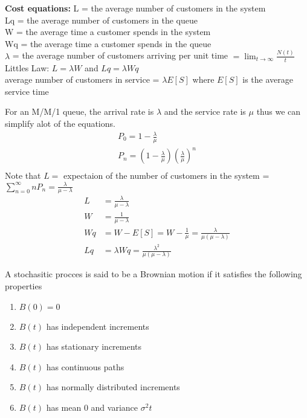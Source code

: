 \documentclass[answers,12pt,addpoints]{exam}
\begin{document}
\begin{definition}
    \textbf{Cost equations:}
    L = the average number of customers in the system\\
    Lq = the average number of customers in the queue\\
    W = the average time a customer spends in the system\\
    Wq = the average time a customer spends in the queue\\
    $\lambda$ = the average number of customers arriving per unit time $= \lim_{t \to \infty} \frac{N(t)}{t}$\\
    Littles Law: $L = \lambda W$ and $Lq = \lambda Wq$\\
    average number of customers in service = $\lambda E[S]$ where $E[S]$ is the average service time
\end{definition}
\begin{definition}[M/M/1 queue]
    For an M/M/1 queue, the arrival rate is $\lambda$ and the service rate is $\mu$ thus we can simplify alot of the equations.\\
    \begin{align*}
        P_0 = 1 - \frac{\lambda}{\mu}\\
        P_n = (1 - \frac{\lambda}{\mu}) (\frac{\lambda}{\mu})^n\\
    \end{align*}
    Note that $L = $ expectaion of the number of customers in the system = $\sum_{n=0}^{\infty} n P_n = \frac{\lambda}{\mu - \lambda}$\\
    \begin{align*}
        L &= \frac{\lambda}{\mu - \lambda}\\
        W &= \frac{1}{\mu - \lambda}\\
        Wq &= W - E[S] = W - \frac{1}{\mu} = \frac{\lambda}{\mu(\mu - \lambda)}\\
        Lq &= \lambda Wq = \frac{\lambda^2}{\mu(\mu - \lambda)}
    \end{align*}
\end{definition}
\begin{definition}
    A stochasitic procces is said to be a Brownian motion if it satisfies the following properties
    \begin{enumerate}
        \item $B(0) = 0$
        \item $B(t)$ has independent increments
        \item $B(t)$ has stationary increments
        \item $B(t)$ has continuous paths
        \item $B(t)$ has normally distributed increments
        \item $B(t)$ has mean 0 and variance $\sigma^2 t$
    \end{enumerate}
\end{definition}
\end{document}
